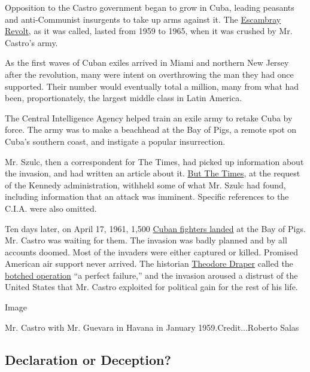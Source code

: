 Opposition to the Castro government began to grow in Cuba, leading
peasants and anti-Communist insurgents to take up arms against it. The
\href{http://www.nytimes.com/1964/05/21/exiles-proclaim-anticastro-war-and-urge-revolt.html}{Escambray
Revolt}, as it was called, lasted from 1959 to 1965, when it was crushed
by Mr. Castro's army.

As the first waves of Cuban exiles arrived in Miami and northern New
Jersey after the revolution, many were intent on overthrowing the man
they had once supported. Their number would eventually total a million,
many from what had been, proportionately, the largest middle class in
Latin America.

The Central Intelligence Agency helped train an exile army to retake
Cuba by force. The army was to make a beachhead at the Bay of Pigs, a
remote spot on Cuba's southern coast, and instigate a popular
insurrection.

Mr. Szulc, then a correspondent for The Times, had picked up information
about the invasion, and had written an article about it.
\href{http://www.nytimes.com/times-insider/2014/12/26/1961-the-c-i-a-readies-a-cuban-invasion-and-the-times-blinks/}{But
The Times}, at the request of the Kennedy administration, withheld some
of what Mr. Szulc had found, including information that an attack was
imminent. Specific references to the C.I.A. were also omitted.

Ten days later, on April 17, 1961, 1,500
\href{http://query.nytimes.com/gst/abstract.html?res=9406E6D7133DE733A2575BC1A9629C946091D6CF}{Cuban
fighters landed} at the Bay of Pigs. Mr. Castro was waiting for them.
The invasion was badly planned and by all accounts doomed. Most of the
invaders were either captured or killed. Promised American air support
never arrived. The historian
\href{http://www.nytimes.com/2006/02/22/national/22DRAPER.html}{Theodore
Draper} called the
\href{http://www.nytimes.com/2001/03/23/world/bay-of-pigs-enemies-finally-sit-down-together.html}{botched
operation} ``a perfect failure,'' and the invasion aroused a distrust of
the United States that Mr. Castro exploited for political gain for the
rest of his life.

Image

Mr. Castro with Mr. Guevara in Havana in January 1959.Credit...Roberto
Salas

\hypertarget{declaration-or-deception}{%
\subsection{Declaration or Deception?}\label{declaration-or-deception}}

